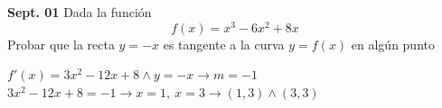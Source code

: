 \documentclass[addpoints,spanish, 12pt,a4paper]{exam}
\begin{document}
\begin{questions}
\begin{parts}
\end{parts}

\question[1] \textbf{Sept. 01} Dada la función $$f(x)=x^3-6x^2+8x$$ 
Probar que la recta $y =-x$ es tangente a la curva $y = f(x)$  en algún punto
\begin{solution}
    $f'(x)=3 x^{2} - 12 x + 8 \land y=-x \to m=-1$\\
    $3 x^{2} - 12 x + 8=-1 \to x=1, \ x=3 \to (1,3) \land (3,3)$

\end{solution}



\addpoints
\end{questions}
\end{document}
